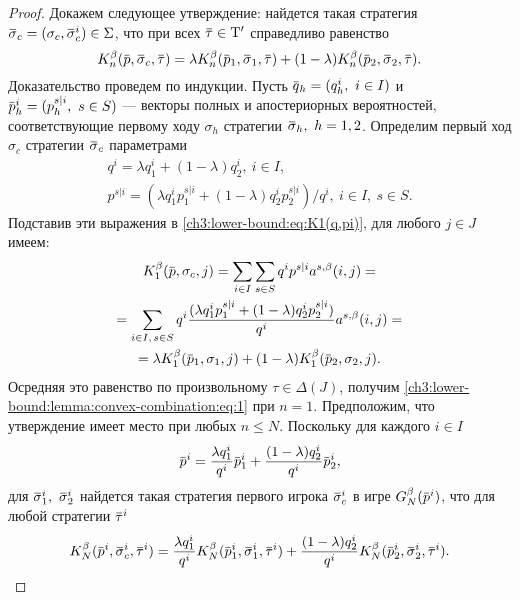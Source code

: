 {\begin{proof}
  Докажем следующее утверждение: найдется такая стратегия $\sigmav_c = (\sigma_c, \sigmav_c^i) \in \Sigma$, что при всех $\tauv \in \Tau'$ справедливо равенство
  \begin{equation}
    \label{ch3:lower-bound:lemma:convex-combination:eq:1}
    \K[n](\p, \sigmav_c, \tauv) =
    \lambda \K[n](\p_1, \sigmav_1, \tauv) +
    (1-\lambda)\K[n](\p_2, \sigmav_2, \tauv).
  \end{equation}
  Доказательство проведем по индукции.
  Пусть $\q_h = (q_h^i,\ i \in I)$ и $\p_h^i = (p_h^{s|i},\ s \in S)$ --- векторы полных и апостериорных вероятностей, соответствующие первому ходу $\sigma_h$ стратегии $\sigmav_h,\ h = 1, 2$.
  Определим первый ход $\sigma_c$ стратегии $\sigmav_c$ параметрами
  \begin{equation*}
    \begin{gathered}
      q^i = \lambda q^i_1 + (1-\lambda) q^i_2,\ i \in I,                               \\
      p^{s|i} = \left(
        \lambda q^i_1 p^{s|i}_1 + (1-\lambda) q^i_2 p^{s|i}_2
      \right) / q^i,\ i \in I,\ s \in S.
    \end{gathered}
  \end{equation*}
  Подставив эти выражения в \eqref{ch3:lower-bound:eq:K1(q,pi)}, для любого $j \in J$ имеем:
  \begin{multline*}
    \K[1](\p, \sigma_c, j) =
    \sum_{i \in I}\sum_{s \in S} q^i p^{s|i} \as(i, j) =                               \\
    = \sum_{i \in I, \, s \in S}
    q^i \frac{(\lambda q^i_1 p^{s|i}_1 + (1-\lambda) q^i_2 p^{s|i}_2)}{q^i} \as(i,j) = \\
    = \lambda \K[1](\p_1, \sigma_1, j) +
    (1-\lambda)\K[1](\p_2, \sigma_2, j).
  \end{multline*}
  Осредняя это равенство по произвольному $\tau \in \Delta(J)$, получим \eqref{ch3:lower-bound:lemma:convex-combination:eq:1} при $n = 1$.
  Предположим, что утверждение имеет место при любых $n \leqslant N$.
  Поскольку для каждого $i \in I$
  \[
    \p^i = \frac{\lambda q_1^i}{q^i} \p_1^i + \frac{(1-\lambda)q_2^i}{q^i} \p_2^i,
  \]
  для $\sigmav_1^i,\ \sigmav_2^i$ найдется такая стратегия первого игрока $\sigmav_c^i$ в игре $\theG[N](\p^i)$, что для любой стратегии $\tauv^i$
  \begin{equation*}
    \begin{gathered}
      \K[N](\p^i, \sigmav^i_c, \tauv^i) =
      \frac{\lambda q^i_1}{q^i} \K[N](\p^i_1, \sigmav^i_1, \tauv^i) +
      \frac{(1-\lambda) q^i_2}{q^i} \K[N](\p^i_2, \sigmav^i_2, \tauv^i).

\end{gathered}
\end{equation*}
\end{proof}}
